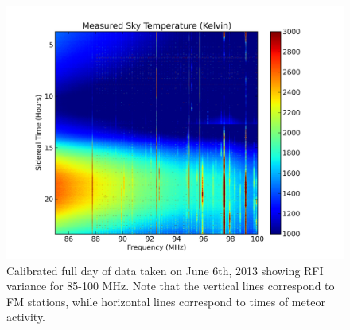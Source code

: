 \begin{figure}[htb]
\begin{center}
\includegraphics[width=0.9\linewidth]{Data_analysis/figures/June_06_unmasked_cal_waterfall_FM.png}
\caption{Calibrated full day of data taken on June 6th, 2013 showing RFI variance for 85-100 MHz. Note that the vertical lines correspond to FM stations, while horizontal lines correspond to times of meteor activity. }
\label{Fig:RFI_wf_long}
\end{center}
\end{figure}

